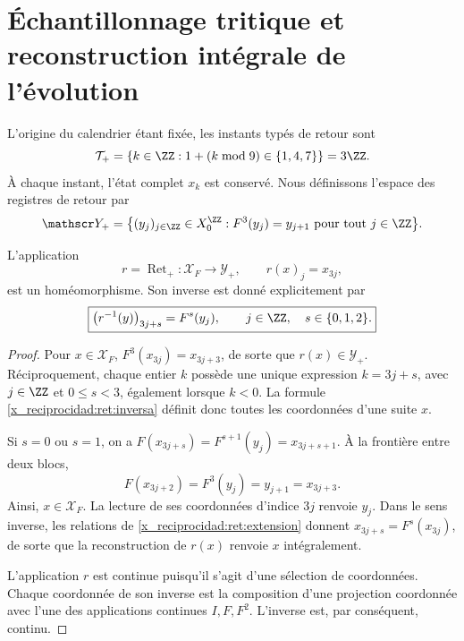 \section{Échantillonnage tritique et reconstruction intégrale de l'évolution}

L’origine du calendrier étant fixée, les instants typés de retour sont
\[
 \mathcal T_+
 =\{k\in\ZZ:1+(k\bmod 9)\in\{1,4,7\}\}=3\ZZ.
\]
À chaque instant, l’état complet \(x_k\) est conservé.
Nous définissons l’espace des registres de retour par
\begin{equation}
 \mathscr Y_+
 =\bigl\{(y_j)_{j\in\ZZ}\in X_0^{\ZZ}:
                 F^3(y_j)=y_{j+1}\text{ pour tout }j\in\ZZ\bigr\}.
 \label{x_reciprocidad:ret:registros}
\end{equation}

\begin{theorem}
\label{x_reciprocidad:ret:homeomorfismo}
L'application
\[
 r=\operatorname{Ret}_+:\mathscr X_F\longrightarrow\mathscr Y_+,
 \qquad r(x)_j=x_{3j},
\]
est un homéomorphisme. Son inverse est donné explicitement par
\begin{equation}
 \boxed{
  \bigl(r^{-1}(y)\bigr)_{3j+s}=F^s(y_j),
  \qquad j\in\ZZ,\quad s\in\{0,1,2\}.}
 \label{x_reciprocidad:ret:inversa}
\end{equation}
\end{theorem}
\begin{proof}
Pour \(x\in\mathscr X_F\),
\(F^3(x_{3j})=x_{3j+3}\), de sorte que \(r(x)\in\mathscr Y_+\).
Réciproquement, chaque entier \(k\) possède une unique expression
\(k=3j+s\), avec \(j\in\ZZ\) et \(0\le s<3\), également lorsque
\(k<0\). La formule \eqref{x_reciprocidad:ret:inversa} définit donc toutes les
coordonnées d’une suite \(x\).

Si \(s=0\) ou \(s=1\), on a
\(F(x_{3j+s})=F^{s+1}(y_j)=x_{3j+s+1}\).
À la frontière entre deux blocs,
\[
 F(x_{3j+2})=F^3(y_j)=y_{j+1}=x_{3j+3}.
\]
Ainsi, \(x\in\mathscr X_F\).
La lecture de ses coordonnées d’indice \(3j\) renvoie \(y_j\).
Dans le sens inverse, les relations de \eqref{x_reciprocidad:ret:extension} donnent
\(x_{3j+s}=F^s(x_{3j})\), de sorte que la reconstruction de \(r(x)\)
renvoie \(x\) intégralement.

L’application \(r\) est continue puisqu’il s’agit d’une sélection de coordonnées.
Chaque coordonnée de son inverse est la composition d’une projection
coordonnée avec l’une des applications continues \(I,F,F^2\).
L’inverse est, par conséquent, continu.
\end{proof}

